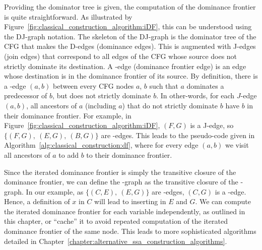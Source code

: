 {Providing the dominator tree is given, the computation of the dominance frontier is quite straightforward. As illustrated by Figure~\ref{fig:classical_construction_algorithm:iDF}, this can be understood using the DJ-graph notation. The skeleton of the DJ-graph is the dominator tree of the CFG that makes the D-edges (dominance edges). This is augmented with J-edges (join edges) that correspond to all edges of the CFG whose source does not strictly dominate its destination. A \DF-edge (dominance frontier edge) is an edge whose destination is in the dominance frontier of its source. By definition, there is a \DF-edge $(a,b)$ between every CFG nodes $a$, $b$ such that $a$ dominates a predecessor of $b$, but does not strictly dominate $b$. 
In other-words, for each  $J$-edge $(a,b)$, all ancestors of $a$ (including
$a$) that do not strictly dominate $b$ have $b$ in their dominance
frontier. For example, in Figure~\ref{fig:classical_construction_algorithm:iDF}, $(F,G)$ is a J-edge, so $\{(F,G),\ (E,G),\ (B,G)\}$ are \DF-edges. This leads to the pseudo-code given in
Algorithm~\ref{alg:classical_construction:df}, where for every edge $(a,b)$ we visit all ancestors of 
$a$ to add $b$ to their dominance frontier.
 
Since the iterated dominance frontier is simply the transitive closure
of the dominance frontier, we can define the \iDF-graph as the transitive closure of the \DF-graph. In our example, as $\{(C,E),\ (E,G)\}$ are \DF-edges, $(C,G)$ is a \iDF-edge. Hence, a definition of $x$ in $C$ will lead to inserting \phifuns in $E$ and $G$.
We can compute the iterated dominance frontier for each variable independently, as outlined in this chapter, or ``cache'' it to avoid repeated computation of the iterated dominance frontier of the same node. This leads to more sophisticated algorithms detailed in Chapter~\ref{chapter:alternative_ssa_construction_algorithms}.

}

